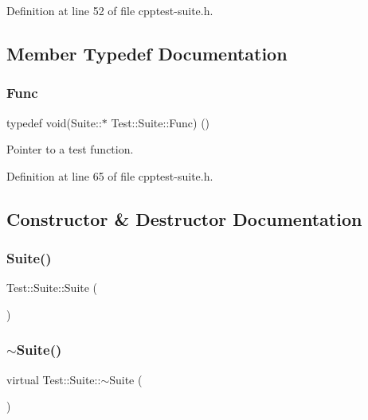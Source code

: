 Definition at line 52 of file cpptest-\/suite.\+h.



\subsection{Member Typedef Documentation}
\mbox{\label{class_test_1_1_suite_a87c40a9c763fc3221bee0e70c431038f}} 
\subsubsection{\texorpdfstring{Func}{Func}}
{\footnotesize\ttfamily typedef void(Suite\+::$\ast$ Test\+::\+Suite\+::\+Func) ()\hspace{0.3cm}{\ttfamily [protected]}}

Pointer to a test function. 

Definition at line 65 of file cpptest-\/suite.\+h.



\subsection{Constructor \& Destructor Documentation}
\mbox{\label{class_test_1_1_suite_a8cb51a002cf4e675820f91fe03ec9117}} 
\subsubsection{\texorpdfstring{Suite()}{Suite()}}
{\footnotesize\ttfamily Test\+::\+Suite\+::\+Suite (\begin{DoxyParamCaption}{ }\end{DoxyParamCaption})}

\mbox{\label{class_test_1_1_suite_a2396d55bb8f9277e19dfdd4fd35421ec}} 
\subsubsection{\texorpdfstring{$\sim$\+Suite()}{~Suite()}}
{\footnotesize\ttfamily virtual Test\+::\+Suite\+::$\sim$\+Suite (\begin{DoxyParamCaption}{ }\end{DoxyParamCaption})\hspace{0.3cm}{\ttfamily [virtual]}}



